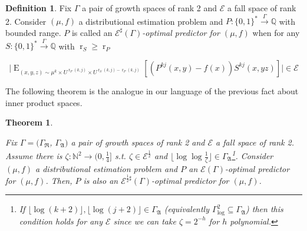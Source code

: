 \documentclass{article}
\theoremstyle{definition}
\newtheorem{definition}{Definition}[section]
\theoremstyle{plain}
\newtheorem{theorem}{Theorem}[section]
\newcommand{\Words}{{\{ 0, 1 \}^*}}
\DeclareMathOperator{\E}{E}
\DeclareMathOperator{\R}{r}
\newcommand{\Nats}{\mathbb{N}}
\newcommand{\Rats}{\mathbb{Q}}
\newcommand{\Abs}[1]{\lvert #1 \rvert}
\newcommand{\Floor}[1]{\lfloor #1 \rfloor}
\begin{document}
\begin {definition}

Fix $\Gamma$ a pair of growth spaces of rank 2 and $\mathcal{E}$ a fall space of rank 2. Consider $(\mu,f)$ a distributional estimation problem and $P: \Words \xrightarrow{\Gamma} \Rats$ with bounded range. $P$ is called an \emph{$\mathcal{E}^\sharp(\Gamma)$-optimal predictor for $(\mu,f)$} when for any $S: \Words \xrightarrow{\Gamma} \Rats$ with $\R_S \geq \R_P$

\begin{equation}
\label{eqn:op_sharp}
\Abs{\E_{(x,y,z) \sim \mu^k \times U^{\R_P(k,j)} \times U^{\R_S(k,j)-\R_P(k,j)}}[(P^{kj}(x,y) - f(x))S^{kj}(x,yz)]} \in \mathcal{E}
\end{equation}

\end {definition}

The following theorem is the analogue in our language of the previous fact about inner product spaces.

\begin{theorem}
\label{thm:ort}

Fix $\Gamma=(\Gamma_{\mathfrak{R}}$, $\Gamma_{\mathfrak{A}})$ a pair of growth spaces of rank 2 and $\mathcal{E}$ a fall space of rank 2. Assume there is $\zeta: \Nats^2 \rightarrow (0,\frac{1}{4}]$ s.t. $\zeta \in \mathcal{E}^{\frac{1}{2}}$ and ${\Floor{\log \log \frac{1}{\zeta}} \in \Gamma_{\mathfrak{A}}}$\footnote{If $\Floor{\log(k+2)}, \Floor{\log(j+2)} \in \Gamma_{\mathfrak{A}}$ (equivalently $\Gamma_{\text{log}}^2 \subseteq \Gamma_{\mathfrak{A}}$) then this condition holds for any $\mathcal{E}$ since we can take $\zeta = 2^{-h}$ for $h$ polynomial.}. Consider $(\mu,f)$ a distributional estimation problem and $P$ an $\mathcal{E}(\Gamma)$-optimal predictor for $(\mu,f)$. Then, $P$ is also an $\mathcal{E}^{\frac{1}{2}\sharp}(\Gamma)$-optimal predictor for $(\mu,f)$.

\end{theorem}
\end{document}

